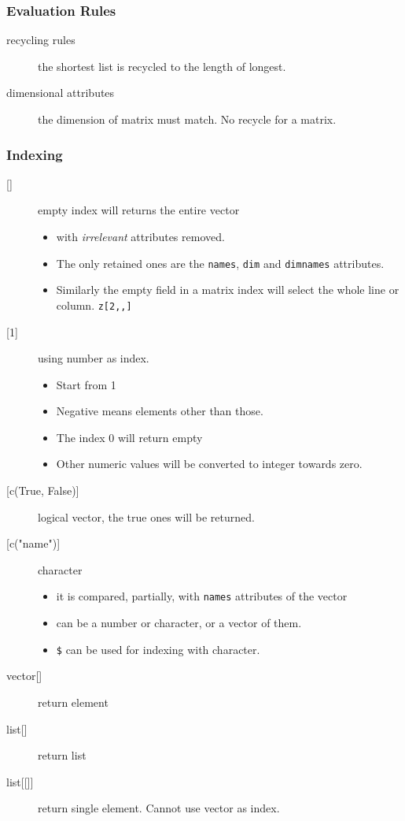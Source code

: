 \subsubsection{Evaluation Rules}
\begin{description}
\item [recycling rules] the shortest list is recycled to the length of longest.
\item [dimensional attributes] the dimension of matrix must match. No recycle for a matrix.
\end{description}


\subsubsection{Indexing}
\begin{description}
\item [{[]}] empty index will returns the entire vector
  \begin{itemize}
  \item with \textit{irrelevant} attributes removed.
  \item The only retained ones are the \texttt{names}, \texttt{dim}
    and \texttt{dimnames} attributes.
  \item Similarly the empty field in a matrix index will select the
    whole line or column. \texttt{z[2,,]}
  \end{itemize}
\item [{[1]}] using number as index.
  \begin{itemize}
  \item Start from 1
  \item Negative means elements other than those.
  \item The index 0 will return empty
  \item Other numeric values will be converted to integer towards
    zero.
  \end{itemize}
\item [{[c(True, False)]}] logical vector, the true ones will be
  returned.
\item [{[c("name")]}] character
  \begin{itemize}
  \item it is compared, partially, with \texttt{names} attributes of
    the vector
  \item can be a number or character, or a vector of them.
  \item \texttt{\$} can be used for indexing with character.
  \end{itemize}
\item [vector{[]}] return element
\item [list{[]}] return list
\item [list{[[]]}] return single element. Cannot use vector as index.
\end{description}


